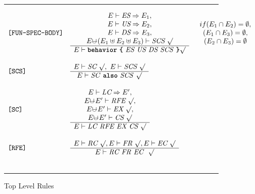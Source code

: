 \documentclass[12pt]{article} %
\newcommand{\reserved}[1]{\textbf{\texttt{#1}}} %
\newcommand{\RULELAB}[1]{\texttt{#1}}
\newcommand{\uminus}{\mbox{$\cup\!\!\!\!-$}}
\newcommand{\UNSPACEFORBOX}{\vspace{-2ex}}
\newcommand{\HLINE}{\UNSPACEFORBOX%
\begin{flushleft}\rule{\textwidth}{0.01in}\end{flushleft}%
\UNSPACEFORBOX}
\newenvironment{BFIGURE}{

\begin{figure}
\small
\HLINE
}{
\HLINE
\normalsize
\end{figure}
}
\begin{document}
\begin{BFIGURE}
\begin{displaymath}
\begin{array}{lll}
\RULELAB{[FUN-SPEC-BODY]} &
\begin{array}{c}
E \vdash \mbox{\it ES} \Rightarrow E_1,\\
E \vdash \mbox{\it US} \Rightarrow E_2,\\
E \vdash \mbox{\it DS}\Rightarrow E_3,\\
E \uminus (E_1 \uplus E_2 \uplus E_3) \vdash \mbox{\it SCS}~\surd\\
\hline
E \vdash \mbox{\reserved{behavior} \reserved{\{} \textit{ES US DS SCS} \reserved{\}}} \surd
\end{array}
&
\begin{array}{c}
if (E_1 \cap E_2) = \emptyset,\\
(E_1 \cap E_3) = \emptyset,\\
(E_2 \cap E_3) = \emptyset
\end{array}
\\
~\\
\RULELAB{[SCS]} &
\begin{array}{c}
E \vdash \mbox{\it SC}~\surd,~E \vdash \mbox{\it SCS}~\surd\\
\hline
E \vdash \mbox{\textit{SC} \reserved{also} \textit{SCS}}~\surd
\end{array}
\\
~\\
\RULELAB{[SC]} &
\begin{array}{c}
E \vdash \mbox{\it LC} \Rightarrow E',\\
E \uminus E' \vdash \mbox{\it RFE}~ \surd,\\
E \uminus E' \vdash \mbox{\it EX}~ \surd,\\
E \uminus E' \vdash \mbox{\it CS}~ \surd\\
\hline
E \vdash \mbox{\it LC RFE EX CS}~ \surd
\end{array}
\\
~\\
\RULELAB{[RFE]} &
\begin{array}{c}
E \vdash \textit{RC}~\surd,E \vdash \textit{FR}~\surd,E\vdash \textit{EC}~ \surd\\
\hline
E \vdash \mbox{\it RC FR EC }~\surd
\end{array}
\\
~\\
\end{array}
\end{displaymath}
\caption{Top Level Rules}
\label{fig-one}
\end{BFIGURE}
\end{document}
